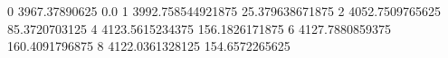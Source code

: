 0 3967.37890625 0.0
1 3992.758544921875 25.379638671875
2 4052.7509765625 85.3720703125
4 4123.5615234375 156.1826171875
6 4127.7880859375 160.4091796875
8 4122.0361328125 154.6572265625
